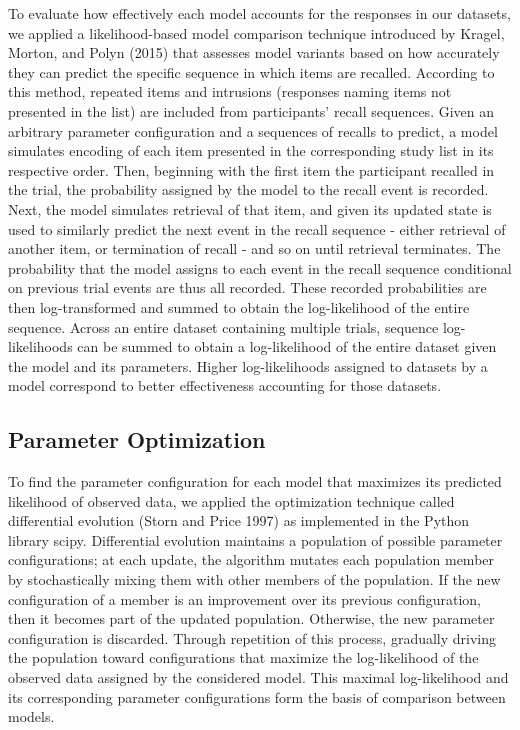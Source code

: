 \documentclass[
  letterpaper,
  DIV=11]{article}
\begin{document}
To evaluate how effectively each model accounts for the responses in our
datasets, we applied a likelihood-based model comparison technique
introduced by Kragel, Morton, and Polyn (2015) that assesses model
variants based on how accurately they can predict the specific sequence
in which items are recalled. According to this method, repeated items
and intrusions (responses naming items not presented in the list) are
included from participants' recall sequences. Given an arbitrary
parameter configuration and a sequences of recalls to predict, a model
simulates encoding of each item presented in the corresponding study
list in its respective order. Then, beginning with the first item the
participant recalled in the trial, the probability assigned by the model
to the recall event is recorded. Next, the model simulates retrieval of
that item, and given its updated state is used to similarly predict the
next event in the recall sequence - either retrieval of another item, or
termination of recall - and so on until retrieval terminates. The
probability that the model assigns to each event in the recall sequence
conditional on previous trial events are thus all recorded. These
recorded probabilities are then log-transformed and summed to obtain the
log-likelihood of the entire sequence. Across an entire dataset
containing multiple trials, sequence log-likelihoods can be summed to
obtain a log-likelihood of the entire dataset given the model and its
parameters. Higher log-likelihoods assigned to datasets by a model
correspond to better effectiveness accounting for those datasets.

\hypertarget{parameter-optimization}{%
\subsection{Parameter Optimization}\label{parameter-optimization}}

To find the parameter configuration for each model that maximizes its
predicted likelihood of observed data, we applied the optimization
technique called differential evolution (Storn and Price 1997) as
implemented in the Python library scipy. Differential evolution
maintains a population of possible parameter configurations; at each
update, the algorithm mutates each population member by stochastically
mixing them with other members of the population. If the new
configuration of a member is an improvement over its previous
configuration, then it becomes part of the updated population.
Otherwise, the new parameter configuration is discarded. Through
repetition of this process, gradually driving the population toward
configurations that maximize the log-likelihood of the observed data
assigned by the considered model. This maximal log-likelihood and its
corresponding parameter configurations form the basis of comparison
between models.
\end{document}
